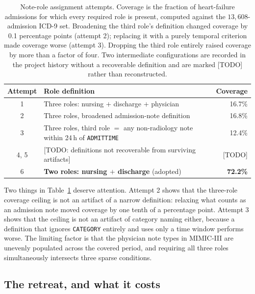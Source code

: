 \begin{table}[t]
\centering
\small
\begin{tabular}{clr}
\toprule
\textbf{Attempt} & \textbf{Role definition} & \textbf{Coverage} \\
\midrule
1 & Three roles: nursing $+$ discharge $+$ physician                       & 16.7\% \\
2 & Three roles, broadened admission-note definition                       & 16.8\% \\
3 & Three roles, third role $=$ any non-radiology note within 24\,h of \texttt{ADMITTIME} & 12.4\% \\
4, 5 & [TODO: definitions not recoverable from surviving artifacts]        & [TODO] \\
6 & \textbf{Two roles: nursing $+$ discharge} (adopted)                    & \textbf{72.2\%} \\
\bottomrule
\end{tabular}
\caption{Note-role assignment attempts. Coverage is the fraction of
heart-failure admissions for which every required role is present, computed
against the $13{,}608$-admission ICD-9 set. Broadening the third role's
definition changed coverage by 0.1 percentage points (attempt 2); replacing it
with a purely temporal criterion made coverage worse (attempt 3). Dropping the
third role entirely raised coverage by more than a factor of four. Two
intermediate configurations are recorded in the project history without a
recoverable definition and are marked [TODO] rather than reconstructed.}
\label{tab:roles}
\end{table}

Two things in Table~\ref{tab:roles} deserve attention. Attempt 2 shows that the
three-role coverage ceiling is not an artifact of a narrow definition: relaxing
what counts as an admission note moved coverage by one tenth of a percentage
point. Attempt 3 shows that the ceiling is not an artifact of category naming
either, because a definition that ignores \texttt{CATEGORY} entirely and uses
only a time window performs worse. The limiting factor is that the physician
note types in MIMIC-III are unevenly populated across the covered period, and
requiring all three roles simultaneously intersects three sparse conditions.

\subsection{The retreat, and what it costs}

